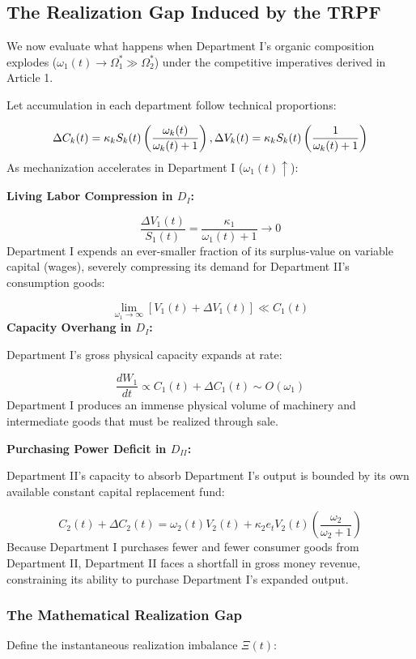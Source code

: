 \documentclass[11pt,letterpaper]{report}
\newcommand{\fitmath}[1]{\begingroup\setbox0=\hbox{$\displaystyle #1$}\ifdim\wd0>\linewidth\resizebox{\linewidth}{!}{$\displaystyle #1$}\else\displaystyle #1\fi\endgroup}
\begin{document}
\subsection{The Realization Gap Induced by the TRPF}
We now evaluate what happens when Department I's organic composition explodes (${\omega }_{1}(t)\rightarrow {\Omega }_{1}^{*}\gg {\Omega }_{2}^{*}$) under the competitive imperatives derived in Article 1.

Let accumulation in each department follow technical proportions:

\[\fitmath{\Delta {C}_{k}(t)={\kappa }_{k}{S}_{k}(t)\left({\frac{{\omega }_{k}(t)}{{\omega }_{k}(t)+1}}\right),\Delta {V}_{k}(t)={\kappa }_{k}{S}_{k}(t)\left({\frac{1}{{\omega }_{k}(t)+1}}\right)}\]
As mechanization accelerates in Department I (${\omega }_{1}(t)\uparrow$):

\textbf{Living Labor Compression in ${D}_{I}$:}

\[
\frac{\Delta {V}_{1}(t)}{{S}_{1}(t)}=\frac{{\kappa }_{1}}{{\omega }_{1}(t)+1}\rightarrow 0
\]
Department I expends an ever-smaller fraction of its surplus-value on variable capital (wages), severely compressing its demand for Department II's consumption goods:

\[
\lim\limits_{{{\omega }_{1}} \rightarrow {\infty }}\left[{{V}_{1}(t)+\Delta {V}_{1}(t)}\right]\ll {C}_{1}(t)
\]
\textbf{Capacity Overhang in ${D}_{I}$:}

Department I's gross physical capacity expands at rate:

\[
\frac{d{W}_{1}}{dt}\propto {C}_{1}(t)+\Delta {C}_{1}(t)\sim O({\omega }_{1})
\]
Department I produces an immense physical volume of machinery and intermediate goods that must be realized through sale.

\textbf{Purchasing Power Deficit in ${D}_{II}$:}

Department II's capacity to absorb Department I's output is bounded by its own available constant capital replacement fund:

\[
{C}_{2}(t)+\Delta {C}_{2}(t)={\omega }_{2}(t){V}_{2}(t)+{\kappa }_{2}{e}_{t}{V}_{2}(t)\left({\frac{{\omega }_{2}}{{\omega }_{2}+1}}\right)
\]
Because Department I purchases fewer and fewer consumer goods from Department II, Department II faces a shortfall in gross money revenue, constraining its ability to purchase Department I's expanded output.

\subsubsection{The Mathematical Realization Gap}
Define the instantaneous realization imbalance $\Xi (t)$:
\end{document}
